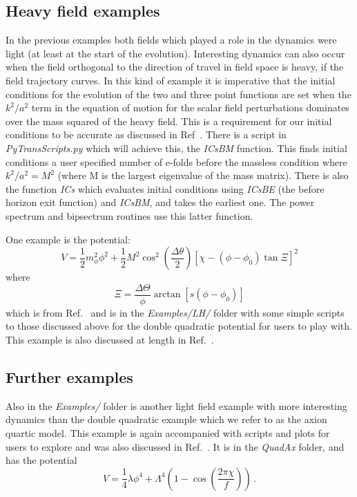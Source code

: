 \documentclass[10pt,
amsmath,amssymb,
aps,prd,nofootinbib,eqsecnum,a4paper]{revtex4}
\def\be{\begin{equation}}
\def\ee{\end{equation}}
\begin{document}
\subsection{Heavy field examples}
\label{heavy}

In the previous examples both fields which played a role in the dynamics 
were light (at least at the start of the evolution). Interesting dynamics 
can also occur when the field orthogonal to the direction of travel 
in field space is heavy, if 
the field trajectory curves. In this kind of example it is imperative that the initial conditions for the evolution of the two and three point functions 
are set when the $k^2/a^2$ term in the equation of motion for the scalar field perturbations 
dominates over the mass squared of the heavy 
field. This is a requirement for our initial conditions to be accurate as discussed in Ref~\cite{xxx}. 
There is a script in {\it PyTransScripts.py} which 
will achieve this, the {\it ICsBM} function. This finds initial conditions a user specified number of e-folds before the 
massless condition where $k^2/a^2=M^2$ (where M is the largest eigenvalue of the mass matrix). 
There is also the function {\it ICs} which evaluates initial conditions using {\it ICsBE} (the before horizon exit 
function) and {\it ICsBM}, and takes the earliest one. The power spectrum and bipsectrum routines use this latter function.

One example is the potential:
\be
V = \frac{1}{2} m^2_\phi \phi^2 + \frac{1}{2}M^2 \cos^2\left ( \frac{\Delta \theta}{2} \right) \left [\chi - (\phi - \phi_0 ) \tan \Xi \right]^2 
\ee
where 
\be
\Xi = \frac{\Delta \Theta}{\phi} \arctan[s (\phi - \phi_0)]
\ee
which is from Ref.~\cite{Gao:2013ota} and is in the  {\it Examples/LH/} folder with some 
simple scripts to those discussed above for the double quadratic potential for users to play with. 
This example is also discussed at length in Ref.~\cite{xxx}.


\subsection{Further examples}
\label{other}

Also in the {\it Examples/} folder is another light field example with more interesting dynamics than the double quadratic 
example which we refer to as the axion quartic model. This example is again accompanied 
with scripts and plots for users to explore and was also discussed in Ref.~\cite{xxx}. It is in the {\it QuadAx} folder, and has the potential
\be
V = \frac{1}{4} \lambda \phi^4 + \Lambda^4 \left ( 1 - \cos \left ( \frac{2\pi \chi}{f} \right) \right )\,.
\ee
\end{document}
